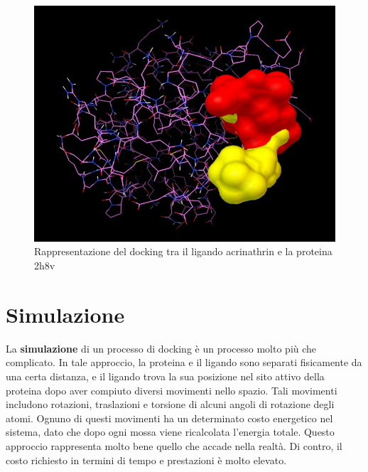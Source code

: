 \begin{figure}[H]
    \centering
    \includegraphics{immagini/capitolo1/dockingMolecolare.png}
    \caption{Rappresentazione del docking tra il ligando acrinathrin e la proteina 2h8v}
    \label{fig:docking molecolare}
\end{figure}

\section{Simulazione}
La \textbf{simulazione} di un processo di docking è un processo molto più che complicato. In tale approccio, la proteina e il ligando sono separati fisicamente da una certa distanza, e il ligando trova la sua posizione nel sito attivo della proteina dopo aver compiuto diversi movimenti nello spazio. Tali movimenti includono rotazioni, traslazioni e torsione di alcuni angoli di rotazione degli atomi. Ognuno di questi movimenti ha un determinato costo energetico nel sistema, dato che dopo ogni mossa viene ricalcolata l'energia totale. Questo approccio rappresenta molto bene quello che accade nella realtà. Di contro, il costo richiesto in termini di tempo e prestazioni è molto elevato.
    
